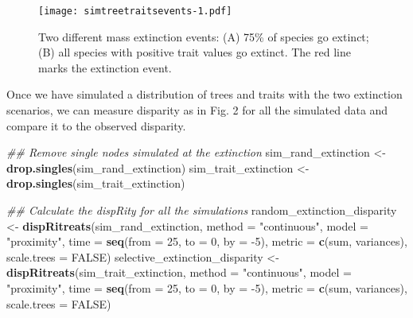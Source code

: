 \documentclass[
]{article}
\newenvironment{Shaded}{\begin{snugshade}}{\end{snugshade}}
\newcommand{\CommentTok}[1]{\textcolor[rgb]{0.56,0.35,0.01}{\textit{#1}}}
\newcommand{\DataTypeTok}[1]{\textcolor[rgb]{0.13,0.29,0.53}{#1}}
\newcommand{\DecValTok}[1]{\textcolor[rgb]{0.00,0.00,0.81}{#1}}
\newcommand{\KeywordTok}[1]{\textcolor[rgb]{0.13,0.29,0.53}{\textbf{#1}}}
\newcommand{\NormalTok}[1]{#1}
\newcommand{\OtherTok}[1]{\textcolor[rgb]{0.56,0.35,0.01}{#1}}
\newcommand{\StringTok}[1]{\textcolor[rgb]{0.31,0.60,0.02}{#1}}
\begin{document}
\begin{figure}
\centering
\texttt{[image: simtreetraitsevents-1.pdf]}
\caption{Two different mass extinction events: (A) 75\% of species go
extinct; (B) all species with positive trait values go extinct. The red
line marks the extinction event.}
\end{figure}

Once we have simulated a distribution of trees and traits with the two
extinction scenarios, we can measure disparity as in Fig. 2 for all the
simulated data and compare it to the observed disparity.

\begin{Shaded}
\begin{Highlighting}[]
\CommentTok{\#\# Remove single nodes simulated at the extinction}
\NormalTok{sim\_rand\_extinction \textless{}{-}}\StringTok{ }\KeywordTok{drop.singles}\NormalTok{(sim\_rand\_extinction)}
\NormalTok{sim\_trait\_extinction \textless{}{-}}\StringTok{ }\KeywordTok{drop.singles}\NormalTok{(sim\_trait\_extinction)}

\CommentTok{\#\# Calculate the dispRity for all the simulations}
\NormalTok{random\_extinction\_disparity \textless{}{-}}\StringTok{ }\KeywordTok{dispRitreats}\NormalTok{(sim\_rand\_extinction,}
                                            \DataTypeTok{method =} \StringTok{"continuous"}\NormalTok{,}
                                            \DataTypeTok{model  =} \StringTok{"proximity"}\NormalTok{,}
                                            \DataTypeTok{time   =} \KeywordTok{seq}\NormalTok{(}\DataTypeTok{from =} \DecValTok{25}\NormalTok{, }\DataTypeTok{to =} \DecValTok{0}\NormalTok{, }\DataTypeTok{by =} \DecValTok{{-}5}\NormalTok{),}
                                            \DataTypeTok{metric =} \KeywordTok{c}\NormalTok{(sum, variances),}
                                            \DataTypeTok{scale.trees =} \OtherTok{FALSE}\NormalTok{)}
\NormalTok{selective\_extinction\_disparity \textless{}{-}}\StringTok{ }\KeywordTok{dispRitreats}\NormalTok{(sim\_trait\_extinction,}
                                            \DataTypeTok{method =} \StringTok{"continuous"}\NormalTok{,}
                                            \DataTypeTok{model  =} \StringTok{"proximity"}\NormalTok{,}
                                            \DataTypeTok{time   =} \KeywordTok{seq}\NormalTok{(}\DataTypeTok{from =} \DecValTok{25}\NormalTok{, }\DataTypeTok{to =} \DecValTok{0}\NormalTok{, }\DataTypeTok{by =} \DecValTok{{-}5}\NormalTok{),}
                                            \DataTypeTok{metric =} \KeywordTok{c}\NormalTok{(sum, variances),}
                                            \DataTypeTok{scale.trees =} \OtherTok{FALSE}\NormalTok{)}


\end{Highlighting}
\end{Shaded}
\end{document}
